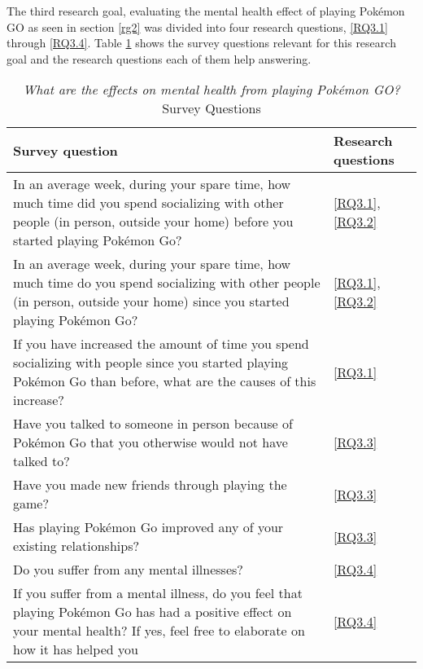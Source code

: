 The third research goal, evaluating the mental health effect of playing Pokémon GO as seen in section \ref{rg2} was divided into four research questions, \ref{RQ3.1} through \ref{RQ3.4}. Table \ref{tbl:rg3-survey-questions} shows the survey questions relevant for this research goal and the research questions each of them help answering.

\begin{table}[h]
	\caption{\emph{What are the effects on mental health from playing Pokémon GO?} Survey Questions}
	\centering
	\label{tbl:rg3-survey-questions}
	\begin{tabularx}{\textwidth}{|X|l|}
		\hline
		\textbf{Survey question} & \textbf{Research questions}\\
		\hline\hline
		
		In an average week, during your spare time, how much time did you spend socializing with other people (in person, outside your home) before you started playing Pokémon Go? & \ref{RQ3.1}, \ref{RQ3.2}\\
		\hline
		
		In an average week, during your spare time, how much time do you spend socializing with other people (in person, outside your home) since you started playing Pokémon Go? & \ref{RQ3.1}, \ref{RQ3.2}\\
		\hline
		
		If you have increased the amount of time you spend socializing with people since you started playing Pokémon Go than before, what are the causes of this increase? & \ref{RQ3.1}\\
		\hline
		
		Have you talked to someone in person because of Pokémon Go that you otherwise would not have talked to? & \ref{RQ3.3}\\
		\hline
		
		Have you made new friends through playing the game? & \ref{RQ3.3}\\
		\hline
		
		Has playing Pokémon Go improved any of your existing relationships? & \ref{RQ3.3}\\
		\hline
		
		Do you suffer from any mental illnesses? & \ref{RQ3.4}\\
		\hline
		
		If you suffer from a mental illness, do you feel that playing Pokémon Go has had a positive effect on your mental health? If yes, feel free to elaborate on how it has helped you & \ref{RQ3.4}\\
		\hline
	\end{tabularx}
\end{table}